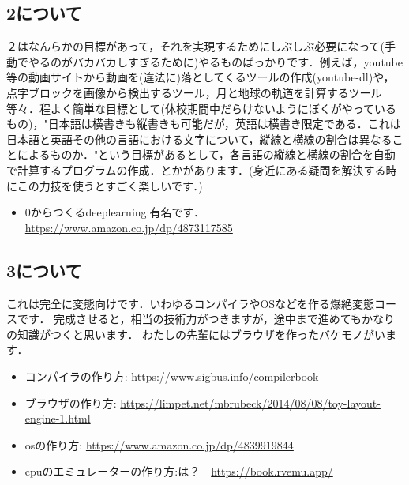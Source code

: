 \documentclass[10pt,twocolumn]{jsarticle}
\begin{document}
\subsection{2について}
２はなんらかの目標があって，それを実現するためにしぶしぶ必要になって(手動でやるのがバカバカしすぎるために)やるものばっかりです．例えば，youtube等の動画サイトから動画を(違法に)落としてくるツールの作成(youtube-dl)や，点字ブロックを画像から検出するツール，月と地球の軌道を計算するツール等々．程よく簡単な目標として(休校期間中だらけないようにぼくがやっているもの)，"日本語は横書きも縦書きも可能だが，英語は横書き限定である．これは日本語と英語その他の言語における文字について，縦線と横線の割合は異なることによるものか．"という目標があるとして，各言語の縦線と横線の割合を自動で計算するプログラムの作成．とかがあります．(身近にある疑問を解決する時にこの力技を使うとすごく楽しいです．)

\begin{itemize}
  \item 0からつくるdeeplearning:有名です．　\url{https://www.amazon.co.jp/dp/4873117585}
\end{itemize}

\subsection{3について}
これは完全に変態向けです．いわゆるコンパイラやOSなどを作る爆絶変態コースです．
完成させると，相当の技術力がつきますが，途中まで進めてもかなりの知識がつくと思います．
わたしの先輩にはブラウザを作ったバケモノがいます．


\begin{itemize}
  \item コンパイラの作り方: \url{https://www.sigbus.info/compilerbook}
  \item ブラウザの作り方: \url{https://limpet.net/mbrubeck/2014/08/08/toy-layout-engine-1.html}
  \item osの作り方: \url{https://www.amazon.co.jp/dp/4839919844}
  \item cpuのエミュレーターの作り方:は？　\url{https://book.rvemu.app/}
\end{itemize}
\end{document}
